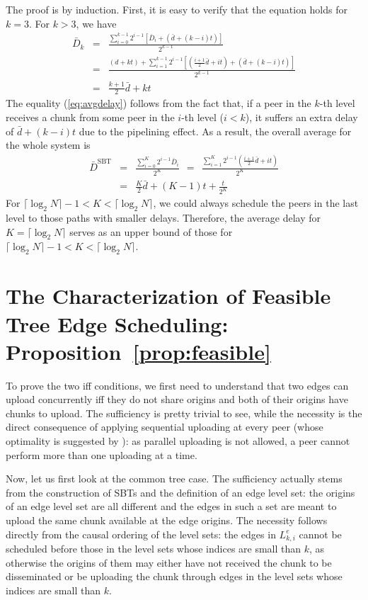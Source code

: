 \documentclass[conference]{IEEEtran}
\begin{document}
   The proof is by induction. First, it is easy to verify that the equation holds for $k=3$. For $k>3$, we have
\begin{eqnarray}
   \!\!\bar{D}_k
   \!\!\!\!&=&\!\!\!\! \frac{\sum_{i=0}^{k-1} 2^{i-1}\left[\bar{D}_i + \left(\bar{d}+(k-i)t\right)\right]}{2^{k-1}} \label{eq:avgdelay}\\
   \!\!\!\!&=&\!\!\!\! \frac{(d+kt)+\displaystyle{\sum_{i=1}^{k-1}} 2^{i-1}    \left[\left(\frac{i+1}{2}\bar{d}+it\right)+\left(\bar{d}+(k-i)t\right)\right]}{2^{k-1}} \nonumber \\
   \!\!\!\!&=&\!\!\!\! \frac{k+1}{2}\bar{d} + kt \nonumber
   \end{eqnarray}
The equality (\ref{eq:avgdelay}) follows from the fact that, if a peer in the $k$-th level receives a chunk from some peer in the $i$-th level ($i<k$), it suffers an extra delay of $\bar{d}+(k-i)t$ due to the pipelining effect. As a result, the overall average for the whole system is
\begin{eqnarray}
   \bar{D}^{\mathrm{SBT}}
   &=& \frac{\textstyle{\sum_{i=0}^{K}} 2^{i-1} \bar{D}_i}{2^K}~~=~~\frac{\sum_{i=1}^{K} 2^{i-1} \left(\frac{i+1}{2}\bar{d}+it\right)}{2^K} \nonumber \\
   &=& \frac{K}{2}\bar{d} + (K-1)t + \frac{t}{2^K} \nonumber
   \end{eqnarray}
For $\lceil\log_2 N\rceil - 1 < K < \lceil\log_2 N\rceil$, we could always schedule the peers in the last level to those paths with smaller delays. Therefore, the average delay for $K=\lceil\log_2 N\rceil$ serves as an upper bound of those for $\lceil\log_2 N\rceil - 1 < K < \lceil\log_2 N\rceil$.

\section{The Characterization of Feasible Tree Edge Scheduling: Proposition~\ref{prop:feasible}} \label{sec:tsch}
To prove the two iff conditions, we first need to understand that two edges can upload concurrently iff they do not share origins and both of their origins have chunks to upload. The sufficiency is pretty trivial to see, while the necessity is the direct consequence of applying sequential uploading at every peer (whose optimality is suggested by \cite{Liu-MM07}): as parallel uploading is not allowed, a peer cannot perform more than one uploading at a time.

  Now, let us first look at the common tree case. The sufficiency actually stems from the construction of SBTs and the definition of an edge level set: the origins of an edge level set are all different and the edges in such a set are meant to upload the same chunk available at the edge origins. The necessity follows directly from the causal ordering of the level sets: the edges in $L^e_{k,i}$ cannot be scheduled before those in the level sets whose indices are small than $k$, as otherwise the origins of them may either have not received the chunk to be disseminated or be uploading the chunk through edges in the level sets whose indices are small than $k$.
\end{document}
